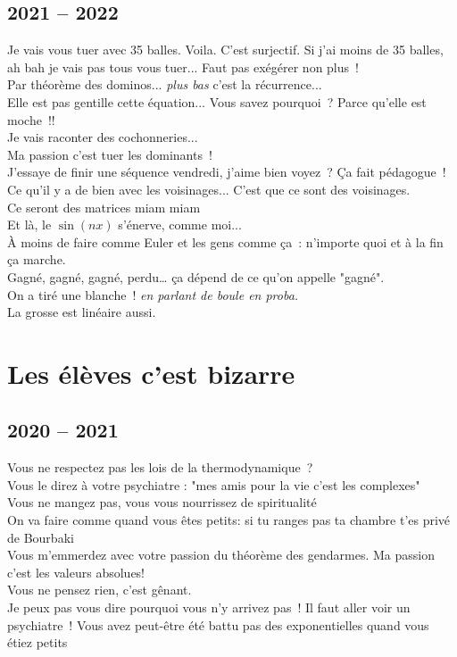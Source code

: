 \documentclass[french, a4paper, openany]{book}
\begin{document}
	\subsection*{2021 -- 2022}
		\noindent \og Je vais vous tuer avec 35 balles. Voila. C'est surjectif. Si j'ai moins de 35 balles, ah bah je vais pas tous vous tuer... Faut pas exégérer non plus~! \fg \\
		\og Par théorème des dominos... \emph{plus bas} c'est la récurrence... \fg \\
		\og Elle est pas gentille cette équation... Vous savez pourquoi~? Parce qu'elle est moche~!! \fg \\
		\og Je vais raconter des cochonneries... \fg \\
		\og Ma passion c'est tuer les dominants~! \fg \\
		\og J'essaye de finir une séquence vendredi, j'aime bien voyez~? Ça fait pédagogue~! \fg \\
		\og Ce qu'il y a de bien avec les voisinages... C'est que ce sont des voisinages. \fg \\
		\og Ce seront des matrices miam miam \fg \\
		\og Et là, le $\sin (nx)$ s'énerve, comme moi... \fg \\
		\og À moins de faire comme Euler et les gens comme ça~: n'importe quoi et à la fin ça marche. \fg \\
		\og Gagné, gagné, gagné, perdu… ça dépend de ce qu'on appelle "gagné". \fg \\
		\og On a tiré une blanche~! \emph{en parlant de boule en proba.} \fg \\
		\og La grosse est linéaire aussi. \fg \\

\section*{Les élèves c'est bizarre}

	\subsection*{2020 -- 2021}
		\noindent \og Vous ne respectez pas les lois de la thermodynamique~? \fg \\
		\og Vous le direz à votre psychiatre : "mes amis pour la vie c'est les complexes" \fg \\
		\og Vous ne mangez pas, vous vous nourrissez de spiritualité \fg \\
		\og On va faire comme quand vous êtes petits: si tu ranges pas ta chambre t'es privé de Bourbaki \fg \\
		\og Vous m'emmerdez avec votre passion du théorème des gendarmes. Ma passion c'est les valeurs absolues! \fg \\
		\og Vous ne pensez rien, c'est gênant. \fg \\
		\og Je peux pas vous dire pourquoi vous n'y arrivez pas~! Il faut aller voir un psychiatre~! Vous avez peut-être été battu pas des exponentielles quand vous étiez petits \fg \\
	
\end{document}
